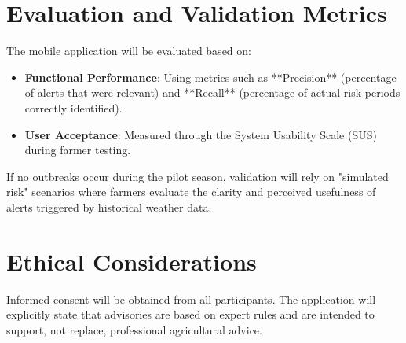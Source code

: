 \documentclass[12pt]{report}
\begin{document}
\section{Evaluation and Validation Metrics}
The mobile application will be evaluated based on:
\begin{itemize}
    \item \textbf{Functional Performance}: Using metrics such as **Precision** (percentage of alerts that were relevant) and **Recall** (percentage of actual risk periods correctly identified).
    \item \textbf{User Acceptance}: Measured through the System Usability Scale (SUS) during farmer testing.
\end{itemize}
If no outbreaks occur during the pilot season, validation will rely on "simulated risk" scenarios where farmers evaluate the clarity and perceived usefulness of alerts triggered by historical weather data.

\section{Ethical Considerations}
Informed consent will be obtained from all participants. The application will explicitly state that advisories are based on expert rules and are intended to support, not replace, professional agricultural advice.

\newpage
{}
{}
\end{document}
